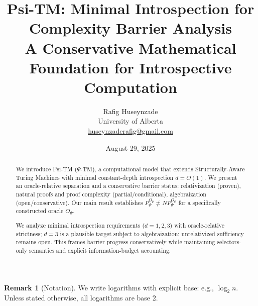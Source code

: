 \documentclass[11pt]{article}
\title{Psi-TM: Minimal Introspection for Complexity Barrier Analysis\\
\large{A Conservative Mathematical Foundation for Introspective Computation}}
\author{Rafig Huseynzade\\
University of Alberta\\
\href{mailto:huseynzaderafig@gmail.com}{huseynzaderafig@gmail.com}}
\date{August 29, 2025}
\theoremstyle{plain}
\theoremstyle{definition}
\newtheorem{remark}[theorem]{Remark}
\begin{document}
\maketitle

\begin{abstract}
We introduce Psi-TM ($\Psi$-TM), a computational model that extends Structurally-Aware Turing Machines with minimal constant-depth introspection $d = O(1)$. We present an oracle-relative separation and a conservative barrier status: relativization (proven), natural proofs and proof complexity (partial/conditional), algebraization (open/conservative). Our main result establishes $P^{O_{\Psi}}_{\Psi} \neq NP^{O_{\Psi}}_{\Psi}$ for a specifically constructed oracle $O_{\Psi}$.

We analyze minimal introspection requirements ($d=1,2,3$) with oracle-relative strictness; $d=3$ is a plausible target subject to algebraization; unrelativized sufficiency remains open. This frames barrier progress conservatively while maintaining selectors-only semantics and explicit information-budget accounting.
\end{abstract}

\tableofcontents
\newpage

\begin{remark}[Notation]
We write logarithms with explicit base: e.g., $\log_{2} n$. Unless stated otherwise, all logarithms are base 2.
\end{remark}





















\end{document}
